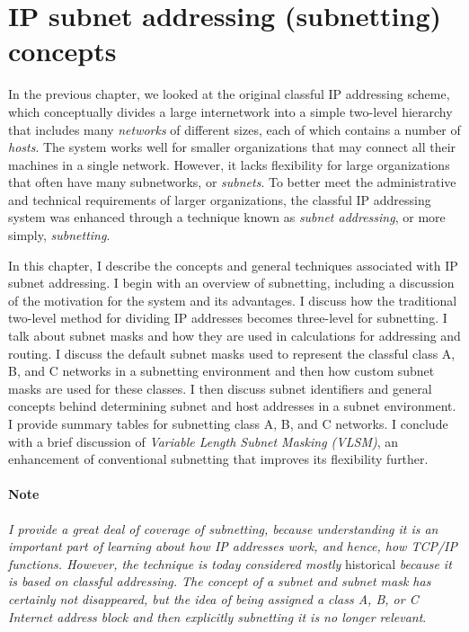 \chapter{IP subnet addressing (subnetting) concepts}
\label{chap:kozierok-ch18}

In the previous chapter, we looked at the original classful IP
addressing scheme, which conceptually divides a large internetwork into
a simple two-level hierarchy that includes many {\emph{networks}} of
different sizes, each of which contains a number of {\emph{hosts}}. The
system works well for smaller organizations that may connect all their
machines in a single network. However, it lacks flexibility for large
organizations that often have many subnetworks, or {\emph{subnets}}. To
better meet the administrative and technical requirements of larger
organizations, the classful IP addressing system was enhanced through a
technique known as {\emph{subnet addressing}}, or more simply,
\protect\hypertarget{ch18.htmlux5cux23idx-CHP-18-0717}{}{}{\emph{subnetting}}.

In this chapter, I describe the concepts and general techniques
associated with IP subnet addressing. I begin with an overview of
subnetting, including a discussion of the motivation for the system and
its advantages. I discuss how the traditional two-level method for
dividing IP addresses becomes three-level for subnetting. I talk about
subnet masks and how they are used in calculations for addressing and
routing. I discuss the default subnet masks used to represent the
classful class A, B, and C networks in a subnetting environment and then
how custom subnet masks are used for these classes. I then discuss
subnet identifiers and general concepts behind determining subnet and
host addresses in a subnet environment. I provide summary tables for
\protect\hypertarget{ch18.htmlux5cux23idx-CHP-18-0718}{}{}subnetting
class A, B, and C networks. I conclude with a brief discussion of
{\emph{Variable Length Subnet Masking (VLSM)}}, an enhancement of
conventional subnetting that improves its flexibility further.

\subsubsection[Note]{\texorpdfstring{\protect\hypertarget{ch18.htmlux5cux23note-69}{}{}Note}{Note}}

{\emph{I provide a great deal of coverage of subnetting, because
understanding it is an important part of learning about how IP addresses
work, and hence, how TCP/IP functions. However, the technique is today
considered mostly}} historical {\emph{because it is based on classful
addressing. The concept of a subnet and subnet mask has certainly not
disappeared, but the idea of being assigned a class A, B, or C Internet
address block and then explicitly subnetting it is no longer relevant}}.


